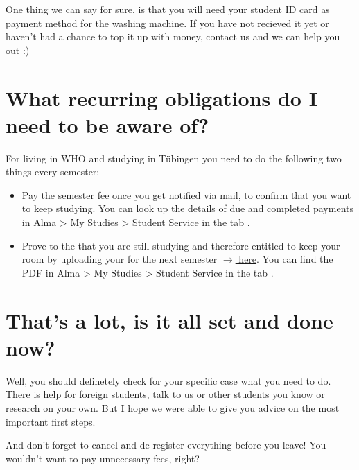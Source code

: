 One thing we can say for sure, is that you will need your student ID card as payment method for the washing machine. If you have not recieved it yet or haven't had a chance to top it up with money, contact us and we can help you out :)

\section{What recurring obligations do I need to be aware of?}

For living in WHO and studying in Tübingen you need to do the following two things every semester:

\begin{itemize}
    \item Pay the semester fee once you get notified via mail, to confirm that you want to keep studying. You can look up the details of due and completed payments in Alma > My Studies > Student Service in the tab .
    \item Prove to the  that you are still studying and therefore entitled to keep your room by uploading your  for the next semester \href{https://tl1.eu/SWTUE/#maintenance/upload}{$\rightarrow{}$ here}. You can find the PDF in Alma > My Studies > Student Service in the tab .
\end{itemize}

\section{That's a lot, is it all set and done now?}

Well, you should definetely check for your specific case what you need to do. There is help for foreign students, talk to us or other students you know or research on your own. But I hope we were able to give you advice on the most important first steps.

And don't forget to cancel and de-register everything before you leave! You wouldn't want to pay unnecessary fees, right?